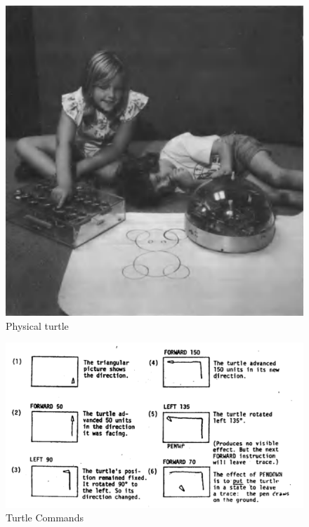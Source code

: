 \begin{figure}
    \includegraphics[max width=\textwidth]{images/turtle.png}
    \caption{Physical turtle \parencite[ii]{papertMindstormsChildrenComputers1980}}
    \label{fig:turtle-commands}
  \end{figure}

  \begin{figure}
    \includegraphics[max width=\textwidth]{images/turtle-commands.png} 
    \caption{Turtle Commands \parencite[827]{solomonHistoryLogo2020a}}
    \label{fig:turtle-commands}
  \end{figure}

